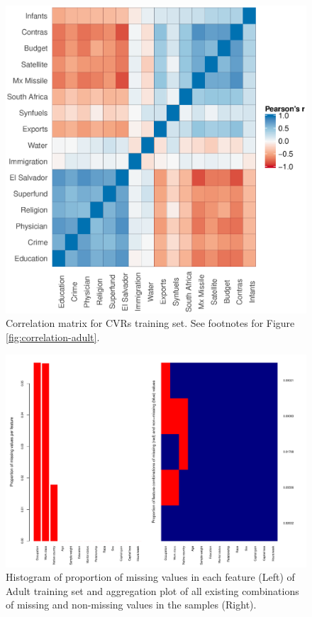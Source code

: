\documentclass[10pt]{book}
\theoremstyle{definition}
\begin{document}
\begin{figure}[h!]
\includegraphics [scale=0.75, center]{figure/correlation-votes}\par
\caption{\footnotesize Correlation matrix for CVRs training set. See footnotes for Figure \ref{fig:correlation-adult}.}
 \label{fig:correlation-votes}
\end{figure}

\begin{figure}[h!]
\includegraphics [scale=0.75, center]{figure/proportion-missing-adult}\par
\caption{\footnotesize Histogram of proportion of missing values in each feature (Left) of Adult training set and aggregation plot of all existing combinations of missing and non-missing values in the samples (Right).}
 \label{fig:proportion-missing-adult}
\end{figure}
\end{document}
